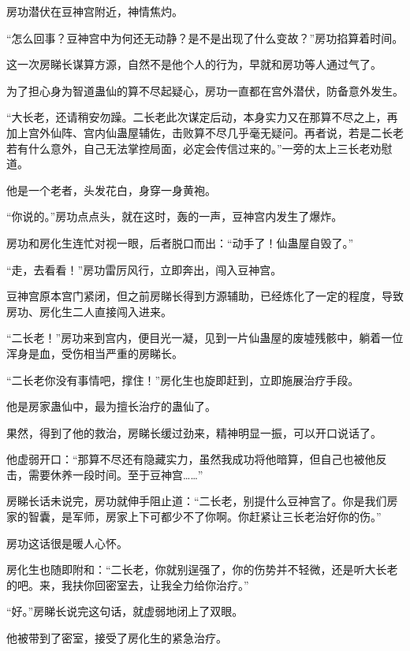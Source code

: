 
\begin{this_body}

房功潜伏在豆神宫附近，神情焦灼。

“怎么回事？豆神宫中为何还无动静？是不是出现了什么变故？”房功掐算着时间。

这一次房睇长谋算方源，自然不是他个人的行为，早就和房功等人通过气了。

为了担心身为智道蛊仙的算不尽起疑心，房功一直都在宫外潜伏，防备意外发生。

“大长老，还请稍安勿躁。二长老此次谋定后动，本身实力又在那算不尽之上，再加上宫外仙阵、宫内仙蛊屋辅佐，击败算不尽几乎毫无疑问。再者说，若是二长老若有什么意外，自己无法掌控局面，必定会传信过来的。”一旁的太上三长老劝慰道。

他是一个老者，头发花白，身穿一身黄袍。

“你说的。”房功点点头，就在这时，轰的一声，豆神宫内发生了爆炸。

房功和房化生连忙对视一眼，后者脱口而出：“动手了！仙蛊屋自毁了。”

“走，去看看！”房功雷厉风行，立即奔出，闯入豆神宫。

豆神宫原本宫门紧闭，但之前房睇长得到方源辅助，已经炼化了一定的程度，导致房功、房化生二人直接闯入进来。

“二长老！”房功来到宫内，便目光一凝，见到一片仙蛊屋的废墟残骸中，躺着一位浑身是血，受伤相当严重的房睇长。

“二长老你没有事情吧，撑住！”房化生也旋即赶到，立即施展治疗手段。

他是房家蛊仙中，最为擅长治疗的蛊仙了。

果然，得到了他的救治，房睇长缓过劲来，精神明显一振，可以开口说话了。

他虚弱开口：“那算不尽还有隐藏实力，虽然我成功将他暗算，但自己也被他反击，需要休养一段时间。至于豆神宫……”

房睇长话未说完，房功就伸手阻止道：“二长老，别提什么豆神宫了。你是我们房家的智囊，是军师，房家上下可都少不了你啊。你赶紧让三长老治好你的伤。”

房功这话很是暖人心怀。

房化生也随即附和：“二长老，你就别逞强了，你的伤势并不轻微，还是听大长老的吧。来，我扶你回密室去，让我全力给你治疗。”

“好。”房睇长说完这句话，就虚弱地闭上了双眼。

他被带到了密室，接受了房化生的紧急治疗。


\end{this_body}
